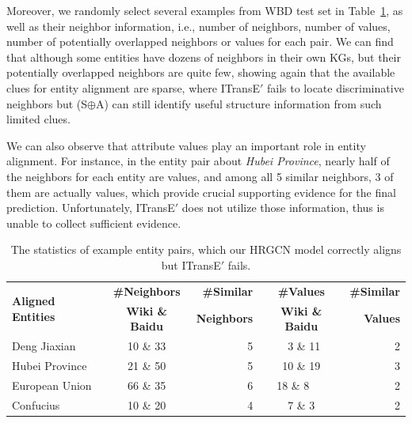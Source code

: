Moreover, we randomly select several examples from WBD test set in Table~\ref{example},
as well as their neighbor information, i.e., number of neighbors, number of values, number of potentially overlapped neighbors or values for each pair.
We can find that although some entities have dozens of neighbors in their own KGs, but their potentially overlapped neighbors are quite few, showing again that
the available clues for entity alignment are sparse,
 where ITransE$'$ fails to locate discriminative neighbors  but  \HRGCN (S$\oplus$A)  can still identify useful structure information from such limited clues.

We can also observe that attribute values play an important role in entity alignment.
For instance, in the entity pair about \textit{Hubei Province}, nearly half of the neighbors for each entity are values, and among all 5 similar neighbors, 3 of them are actually values,
which provide crucial supporting evidence for the final prediction. Unfortunately, ITransE$'$ does not utilize those information, thus is unable to collect sufficient evidence.

\begin{table}
	\centering
	\scriptsize
	\begin{tabular}{lcrcr}
		\toprule
		\multirow{2}{*}{\bf Aligned Entities} & \bf \#Neighbors & \bf \#Similar & \bf \#Values & \bf \#Similar \\
		&\bf  Wiki \& Baidu &\bf  Neighbors &\bf  Wiki \& Baidu &\bf  Values \\
		\midrule
		Deng Jiaxian & 10 \& 33 & 5 & \ 3 \& 11 & 2\\
		Hubei Province & 21 \& 50 & 5 & 10 \& 19 & 3\\
		European Union & 66 \& 35 & 6 & 18 \& 8\ \ \ & 2\\
		Confucius & 10 \& 20 & 4 & 7 \& 3 & 2\\
		\bottomrule
	\end{tabular}
	\caption{The statistics of example entity pairs, which our HRGCN model correctly aligns but ITransE$'$ fails.}
	\label{example}
\end{table}


